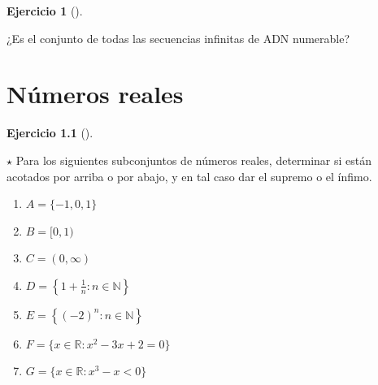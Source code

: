 \documentclass[
  a4paper,
]{scrreport}
\providecommand{\tightlist}{%
  \setlength{\itemsep}{0pt}\setlength{\parskip}{0pt}}\usepackage{longtable,booktabs,array}
\theoremstyle{definition}
\newtheorem{exercise}{Ejercicio}[chapter]
\theoremstyle{remark}
\begin{document}
\leavevmode{}%
\begin{exercise}[]\label{exr-conjunto-secuencias-adn-numerable}

¿Es el conjunto de todas las secuencias infinitas de ADN numerable?

\end{exercise}


\hypertarget{nuxfameros-reales}{%
\chapter{Números reales}\label{nuxfameros-reales}}

\leavevmode{}%
\begin{exercise}[]\label{exr-supremos-infimos-reales}

\(\star\) Para los siguientes subconjuntos de números reales, determinar
si están acotados por arriba o por abajo, y en tal caso dar el supremo o
el ínfimo.

\begin{enumerate}
\def\labelenumi{\alph{enumi}.}
\tightlist
\item
  \(A = \{-1,0,1\}\)
\item
  \(B= [0,1)\)
\item
  \(C= (0,\infty)\)
\item
  \(D= \left\{1+\frac{1}{n}:n\in\mathbb{N}\right\}\)
\item
  \(E= \left\{(-2)^n:n\in\mathbb{N}\right\}\)
\item
  \(F= \{x\in\mathbb{R}:x^2-3x+2=0\}\)
\item
  \(G= \{x\in\mathbb{R}:x^3-x<0\}\)
\end{enumerate}

\end{exercise}
\end{document}

